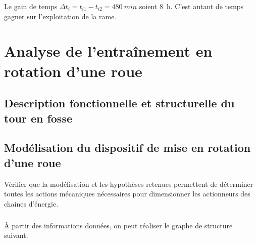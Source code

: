 \documentclass[10pt,fleqn]{article} %
\begin{document}
Le gain de temps $\Delta t_i = t_{i1}-t_{i2}=\SI{480}{min}$ soient \SI{8}{h}. C'est autant de temps gagner sur l'exploitation de la rame. 


\section{Analyse de l’entraînement en rotation d’une roue}
\subsection{Description fonctionnelle et structurelle du tour en fosse}
\subsection{Modélisation du dispositif de mise en rotation d’une roue}


\begin{obj}
Vérifier que la modélisation et les hypothèses retenues permettent de déterminer toutes les actions mécaniques nécessaires pour dimensionner les actionneurs des chaines d’énergie.
\end{obj}

\subparagraph{}
À partir des informations données, on peut réaliser le graphe de structure suivant. 
\end{document}
